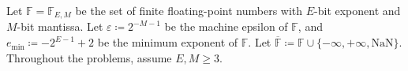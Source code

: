 \documentclass[11pt,oneside]{article}
\begin{document}

Let $\mathbb F=\mathbb F_{E, M}$ be the set of finite floating-point numbers with $E$-bit
exponent and $M$-bit mantissa. Let $\varepsilon\coloneqq2^{-M-1}$ be
the machine epsilon of $\mathbb F$, and
$e_{\min}\coloneqq-2^{E-1}+2$ be the minimum exponent of $\mathbb F$.
Let $\overline{\mathbb F}\coloneqq\mathbb F\cup\{-\infty, +\infty,
\mathrm{NaN}\}$. Throughout the problems, assume $E, M\ge3$.
\end{document}
